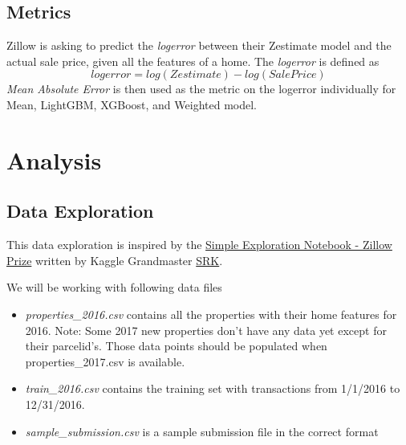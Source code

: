 \documentclass[a4paper]{article}
\begin{document}
\subsection{Metrics}
%
%
Zillow is asking to predict the \textit{logerror} between their Zestimate model and the
actual sale price, given all the features of a home. The \textit{logerror} is defined as
\[ logerror = log(Zestimate) - log(SalePrice) \]
\textit{Mean Absolute Error} is then used as the metric on the logerror individually for Mean, LightGBM, XGBoost, and Weighted model.


\section{Analysis}

\subsection{Data Exploration}
This data exploration is inspired by the \href{https://www.kaggle.com/sudalairajkumar/simple-exploration-notebook-zillow-prize}{Simple Exploration Notebook - Zillow Prize} written by Kaggle Grandmaster \href{https://www.kaggle.com/sudalairajkumar}{SRK}.

We will be working with following data files
\begin{itemize}
    \item \textit{properties\_2016.csv} contains all the properties with their home features for 2016. Note: Some 2017 new
    properties don't have any data yet except for their parcelid's. Those data points should be populated when
    properties\_2017.csv is available.
    \item \textit{train\_2016.csv} contains the training set with transactions from 1/1/2016 to 12/31/2016.
    \item \textit{sample\_submission.csv} is a sample submission file in the correct format
\end{itemize}
\end{document}
